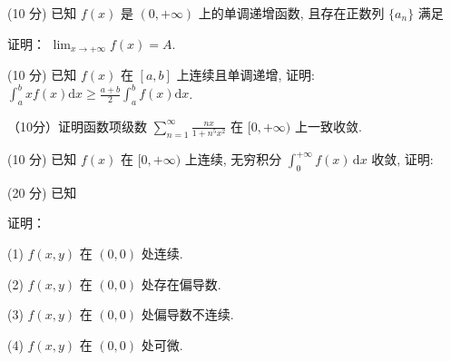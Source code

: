(10 分) 已知 $f(x)$ 是 $(0, +\infty)$ 上的单调递增函数, 且存在正数列 $\{a_n\}$ 满足\par
\nopagebreak[4]
证明： $\lim_{x\to +\infty}f(x) = A.$\par
\par{}
(10 分) 已知 $f(x)$ 在 $[a, b]$ 上连续且单调递增, 证明: $\int_{a}^{b} x f(x) \mathrm{d}x \geq \frac{a + b}{2} \int_{a}^{b} f(x) \mathrm{d}x$.\par
\par{}
（10分）证明函数项级数 $\sum_{n = 1}^{\infty}\frac{nx}{1 + n^5x^2}$ 在 $[0, + \infty)$ 上一致收敛.\par
\par{}
\par{}
(10 分) 已知 $f(x)$ 在 $[0, +\infty)$ 上连续, 无穷积分 $\int_0^{+\infty} f(x) \, \mathrm{d}x$ 收敛, 证明:\par
\nopagebreak[4]
\par{}
\par{}
(20 分) 已知\par
\nopagebreak[4]
证明：\par
(1) $f(x,y)$ 在 $(0,0)$ 处连续.\par
(2) $f(x,y)$ 在 $(0,0)$ 处存在偏导数.\par
(3) $f(x,y)$ 在 $(0,0)$ 处偏导数不连续.\par
(4) $f(x,y)$ 在 $(0,0)$ 处可微.\par

